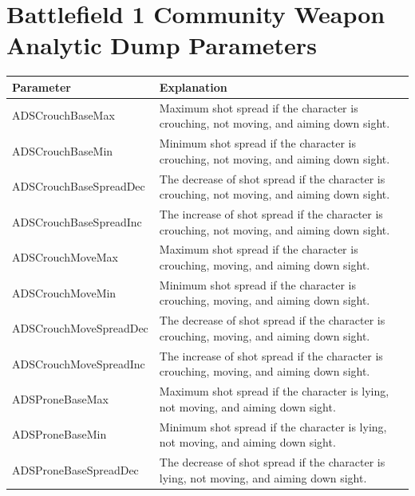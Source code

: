 \documentclass[MGS,Master,english]{twbook}%
\begin{document}
\chapter{Battlefield 1 Community Weapon Analytic Dump Parameters}
\begin{longtable}[c]{|l|p{10.5cm}|}
	\hline
	\textbf{Parameter}     & \textbf{Explanation}                                                                                                           \\ \hline
	\endhead
	ADSCrouchBaseMax       & Maximum shot spread if the character is crouching, not moving, and aiming down sight.                                          \\ \hline
	ADSCrouchBaseMin       & Minimum shot spread if the character is crouching, not moving, and aiming down sight.                                          \\ \hline
	ADSCrouchBaseSpreadDec & The decrease of shot spread if the character is crouching, not moving, and aiming down sight.                                  \\ \hline
	ADSCrouchBaseSpreadInc & The increase of shot spread if the character is crouching, not moving, and aiming down sight.                                  \\ \hline
	ADSCrouchMoveMax       & Maximum shot spread if the character is crouching, moving, and aiming down sight.                                              \\ \hline
	ADSCrouchMoveMin       & Minimum shot spread if the character is crouching, moving, and aiming down sight.                                              \\ \hline
	ADSCrouchMoveSpreadDec & The decrease of shot spread if the character is crouching, moving, and aiming down sight.                                      \\ \hline
	ADSCrouchMoveSpreadInc & The increase of shot spread if the character is crouching, moving, and aiming down sight.                                      \\ \hline
	ADSProneBaseMax        & Maximum shot spread if the character is lying, not moving, and aiming down sight.                                              \\ \hline
	ADSProneBaseMin        & Minimum shot spread if the character is lying, not moving, and aiming down sight.                                              \\ \hline
	ADSProneBaseSpreadDec  & The decrease of shot spread if the character is lying, not moving, and aiming down sight.                                      \\ \hline

\end{longtable}
\end{document}
